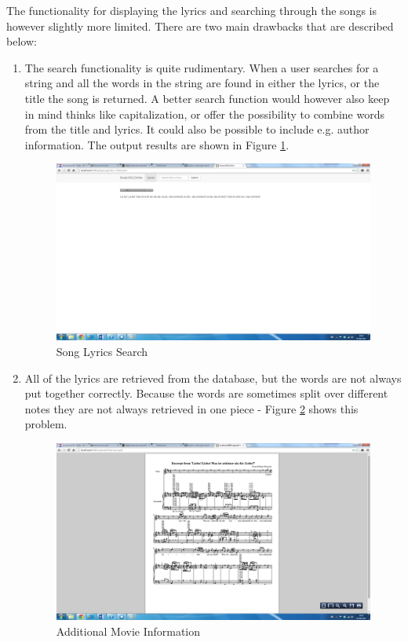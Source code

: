 \documentclass[MusicXML.tex]{subfiles}
\begin{document}
The functionality for displaying the lyrics and searching through the songs is however slightly more limited. There are two main drawbacks that are described below:  

\begin{enumerate}
\item The search functionality is quite rudimentary. When a user searches for a string and all the words in the string are found in either the lyrics, or the title the song is returned. A better search function would however also keep in mind thinks like capitalization, or offer the possibility to combine words from the title and lyrics. It could also be possible to include e.g. author information. The output results are shown in Figure \ref{fig:musiclyricssearch}.

\begin{figure} [H]
	\centering
	\includegraphics[width=1\textwidth]{./Figures/MusicXMLOnline-player.png}
	\caption{Song Lyrics Search}
	\label{fig:musiclyricssearch}
\end{figure}

\item All of the lyrics are retrieved from the database, but the words are not always put together correctly. Because the words are sometimes split over different notes they are not always retrieved in one piece - Figure \ref{fig:musicpdf} shows this problem.

\begin{figure} [H]
	\centering
	\includegraphics[width=1\textwidth]{./Figures/MusicXMLOnline-pdf.png}
	\caption{Additional Movie Information}
	\label{fig:musicpdf}
\end{figure}

\end{enumerate}
\end{document}
